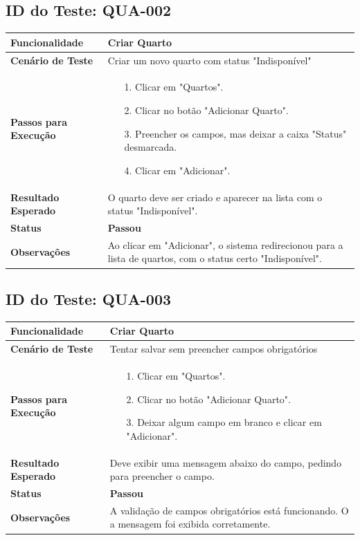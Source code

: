 \documentclass[
	12pt,				%
	openany,			%
	oneside,			%
	a4paper,			%
	english,			%
	french,				%
	spanish,			%
	brazil				%
	]{abntex2}
\begin{document}
\begin{apendicesenv}
\subsection*{ID do Teste: QUA-002}
\begin{tabular}{@{} p{5cm} p{11cm} @{}}
	\toprule
	\textbf{Funcionalidade} & Criar Quarto \\
	\midrule
	\textbf{Cenário de Teste} & Criar um novo quarto com status "Indisponível" \\
	\midrule
	\textbf{Passos para Execução} &
	\begin{itemize} \itemsep0em 
		\item[1.] Clicar em "Quartos".
		\item[2.] Clicar no botão "Adicionar Quarto".
		\item[3.] Preencher os campos, mas deixar a caixa "Status" desmarcada.
		\item[4.] Clicar em "Adicionar".
	\end{itemize} \\
	\midrule
	\textbf{Resultado Esperado} & O quarto deve ser criado e aparecer na lista com o status "Indisponível". \\
	\midrule
	\textbf{Status} & \textbf{Passou} \\
	\midrule
	\textbf{Observações} & Ao clicar em "Adicionar", o sistema redirecionou para a lista de quartos, com o status certo "Indisponível". \\
\end{tabular}
\newpage

\subsection*{ID do Teste: QUA-003}
\begin{tabular}{@{} p{5cm} p{11cm} @{}}
	\toprule
	\textbf{Funcionalidade} & Criar Quarto \\
	\midrule
	\textbf{Cenário de Teste} & Tentar salvar sem preencher campos obrigatórios \\
	\midrule
	\textbf{Passos para Execução} &
	\begin{itemize} \itemsep0em 
		\item[1.] Clicar em "Quartos".
		\item[2.] Clicar no botão "Adicionar Quarto".
		\item[3.] Deixar algum campo em branco e clicar em "Adicionar".
	\end{itemize} \\
	\midrule
	\textbf{Resultado Esperado} & Deve exibir uma mensagem abaixo do campo, pedindo para preencher o campo. \\
	\midrule
	\textbf{Status} & \textbf{Passou} \\
	\midrule
	\textbf{Observações} & A validação de campos obrigatórios está funcionando. O a mensagem foi exibida corretamente. \\
	

\end{tabular}
\end{apendicesenv}
\end{document}
